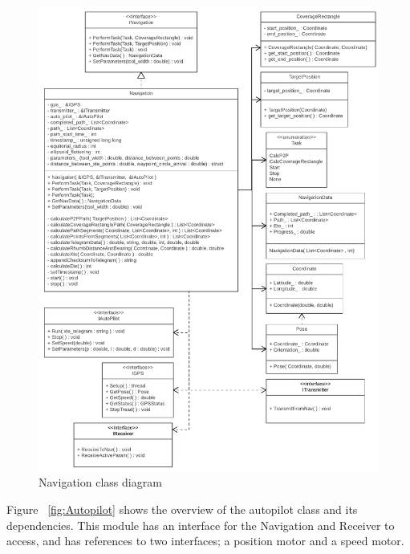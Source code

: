 \begin{figure}[H]
\centering
\includegraphics[width=1\linewidth]{Navigation_class_diagram}
\caption{Navigation class diagram}
\label{fig:Navigation}
\end{figure}

Figure ~\ref{fig:Autopilot} shows the overview of the autopilot class and its dependencies. This module has an interface for the Navigation and Receiver to access, and has references to two interfaces; a position motor and a speed motor. 


